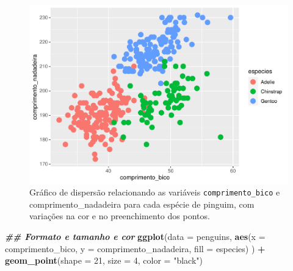 \documentclass[
]{article}
\newenvironment{Shaded}{\begin{snugshade}}{\end{snugshade}}
\newcommand{\AttributeTok}[1]{\textcolor[rgb]{0.13,0.29,0.53}{#1}}
\newcommand{\DecValTok}[1]{\textcolor[rgb]{0.00,0.00,0.81}{#1}}
\newcommand{\DocumentationTok}[1]{\textcolor[rgb]{0.56,0.35,0.01}{\textbf{\textit{#1}}}}
\newcommand{\FunctionTok}[1]{\textcolor[rgb]{0.13,0.29,0.53}{\textbf{#1}}}
\newcommand{\NormalTok}[1]{#1}
\newcommand{\SpecialCharTok}[1]{\textcolor[rgb]{0.81,0.36,0.00}{\textbf{#1}}}
\newcommand{\StringTok}[1]{\textcolor[rgb]{0.31,0.60,0.02}{#1}}
\begin{document}
\begin{figure}
\centering
\includegraphics{epr_files/figure-latex/fig-scatter-shape-2.pdf}
\caption{\label{fig:fig-scatter-shape-2}Gráfico de dispersão relacionando as variáveis \texttt{comprimento\_bico} e comprimento\_nadadeira para cada espécie de pinguim, com variações na cor e no preenchimento dos pontos.}
\end{figure}

\begin{Shaded}
\begin{Highlighting}[]
\DocumentationTok{\#\# Formato e tamanho e cor}
\FunctionTok{ggplot}\NormalTok{(}\AttributeTok{data =}\NormalTok{ penguins, }
       \FunctionTok{aes}\NormalTok{(}\AttributeTok{x =}\NormalTok{ comprimento\_bico, }\AttributeTok{y =}\NormalTok{ comprimento\_nadadeira, }\AttributeTok{fill =}\NormalTok{ especies)}
\NormalTok{       ) }\SpecialCharTok{+}
    \FunctionTok{geom\_point}\NormalTok{(}\AttributeTok{shape =} \DecValTok{21}\NormalTok{, }\AttributeTok{size =} \DecValTok{4}\NormalTok{, }\AttributeTok{color =} \StringTok{"black"}\NormalTok{)}
\end{Highlighting}
\end{Shaded}
\end{document}
